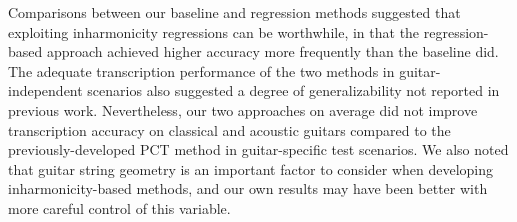 \documentclass[convention,peer-reviewed]{aesconf}
\begin{document}
Comparisons between our baseline and regression methods suggested that exploiting inharmonicity regressions can be worthwhile, in that the regression-based approach achieved higher accuracy more frequently than the baseline did. The adequate transcription performance of the two methods in guitar-independent scenarios also suggested a degree of generalizability not reported in previous work. Nevertheless, our two approaches on average did not improve transcription accuracy on classical and acoustic guitars compared to the previously-developed PCT method in guitar-specific test scenarios. We also noted that guitar string geometry is an important factor to consider when developing inharmonicity-based methods, and our own results may have been better with more careful control of this variable.




\end{document}

